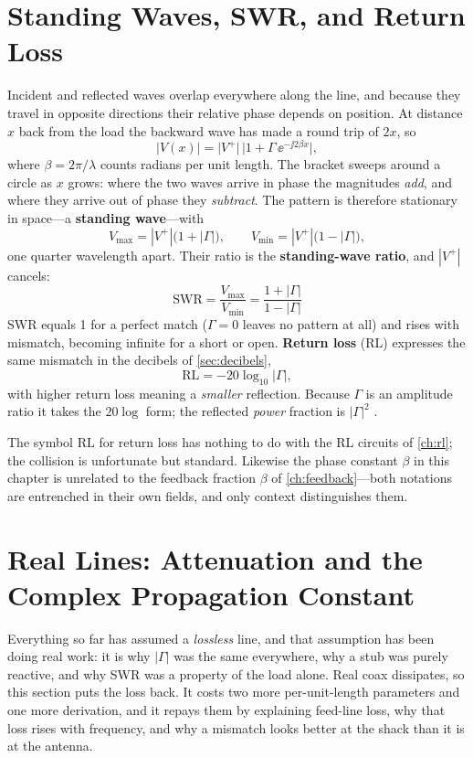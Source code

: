\section{Standing Waves, SWR, and Return Loss}
Incident and reflected waves overlap everywhere along the line, and because they
travel in opposite directions their relative phase depends on position. At distance
\(x\) back from the load the backward wave has made a round trip of \(2x\), so
\[
|V(x)|=\bigl|V^{+}\bigr|\,\bigl|1+\Gamma\,\ee^{-\jj 2\beta x}\bigr| ,
\]
where \(\beta=2\pi/\lambda\) counts radians per unit length. The bracket sweeps
around a circle as \(x\) grows: where the two waves arrive in phase the magnitudes
\emph{add}, and where they arrive out of phase they \emph{subtract}. The pattern is
therefore stationary in space---a \textbf{standing wave}---with
\[
V_{\max}=|V^{+}|\bigl(1+|\Gamma|\bigr),
\qquad
V_{\min}=|V^{+}|\bigl(1-|\Gamma|\bigr),
\]
one quarter wavelength apart. Their ratio is the \textbf{standing-wave ratio},
and \(|V^{+}|\) cancels:
\[
\boxed{\;\mathrm{SWR}=\frac{V_{\max}}{V_{\min}}
=\frac{1+|\Gamma|}{1-|\Gamma|}\;}
\]
SWR equals 1 for a perfect match (\(\Gamma=0\) leaves no pattern at all) and rises
with mismatch, becoming infinite for a short or open. \textbf{Return loss} (RL)
expresses the same mismatch in the decibels of \cref{sec:decibels},
\[
\mathrm{RL}=-20\log_{10}|\Gamma| ,
\]
with higher return loss meaning a \emph{smaller} reflection. Because \(\Gamma\) is
an amplitude ratio it takes the \(20\log\) form; the reflected \emph{power}
fraction is \(|\Gamma|^2\) \cite[pp.~8--14]{free2022rfmicrowave}.

\begin{mistakebox}
The symbol \(\mathrm{RL}\) for return loss has nothing to do with the RL circuits of
\cref{ch:rl}; the collision is unfortunate but standard. Likewise the phase constant
\(\beta\) in this chapter is unrelated to the feedback fraction \(\beta\) of
\cref{ch:feedback}---both notations are entrenched in their own fields, and only
context distinguishes them.
\end{mistakebox}

\section{Real Lines: Attenuation and the Complex Propagation Constant}
\label{sec:lineloss}
Everything so far has assumed a \emph{lossless} line, and that assumption has been
doing real work: it is why \(|\Gamma|\) was the same everywhere, why a stub was
purely reactive, and why SWR was a property of the load alone. Real coax
dissipates, so this section puts the loss back. It costs two more per-unit-length
parameters and one more derivation, and it repays them by explaining feed-line
loss, why that loss rises with frequency, and why a mismatch looks better at the
shack than it is at the antenna.

